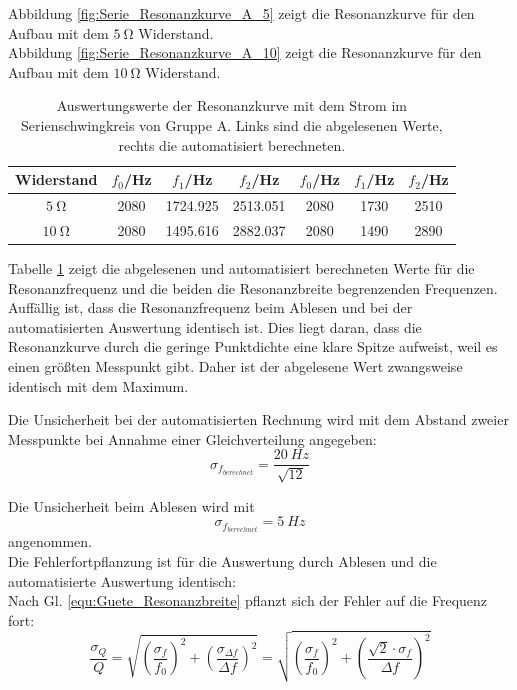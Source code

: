 \documentclass[12pt,a4paper]{article}
\begin{document}
Abbildung \ref{fig:Serie_Resonanzkurve_A_5} zeigt die Resonanzkurve für den Aufbau mit dem $\SI{5}{\ohm}$ Widerstand. \\
Abbildung \ref{fig:Serie_Resonanzkurve_A_10} zeigt die Resonanzkurve für den Aufbau mit dem $\SI{10}{\ohm}$ Widerstand.

\begin{table}
\centering
\begin{tabular}{|c|c|c|c||c|c|c|}
\hline
Widerstand & $f_0$/Hz & $f_1$/Hz & $f_2$/Hz & $f_0$/Hz & $f_1$/Hz & $f_2$/Hz \\
\hline
$\SI{5}{\ohm}$ & 2080 & 1724.925 & 2513.051 & 2080 & 1730 & 2510 \\
\hline
$\SI{10}{\ohm}$ & 2080 & 1495.616 & 2882.037 & 2080 & 1490 & 2890 \\
\hline
\end{tabular}
\caption{Auswertungswerte der Resonanzkurve mit dem Strom im Serienschwingkreis von Gruppe A. Links sind die abgelesenen Werte, rechts die automatisiert berechneten.}
\label{tab:StromResonanz_A}
\end{table}

Tabelle \ref{tab:StromResonanz_A} zeigt die abgelesenen und automatisiert berechneten Werte für die Resonanzfrequenz und die beiden die Resonanzbreite begrenzenden Frequenzen. Auffällig ist, dass die Resonanzfrequenz beim Ablesen und bei der automatisierten Auswertung identisch ist. Dies liegt daran, dass die Resonanzkurve durch die geringe Punktdichte eine klare Spitze aufweist, weil es einen größten Messpunkt gibt. Daher ist der abgelesene Wert zwangsweise identisch mit dem Maximum.

Die Unsicherheit bei der automatisierten Rechnung wird mit dem Abstand zweier Messpunkte bei Annahme einer Gleichverteilung angegeben:
\begin{equation*}
\sigma_{f_{berechnet}} = \dfrac{\SI{20}{Hz}}{\sqrt{12}}
\end{equation*}

Die Unsicherheit beim Ablesen wird mit 
\begin{equation*}
\sigma_{f_{berechnet}} = \SI{5}{Hz}
\end{equation*}
angenommen.\\
Die Fehlerfortpflanzung ist für die Auswertung durch Ablesen und die automatisierte Auswertung identisch:\\
Nach Gl. \ref{equ:Guete_Resonanzbreite} pflanzt sich der Fehler auf die Frequenz fort:
\begin{equation}
\dfrac{\sigma_Q}{Q} = \sqrt{\left( \dfrac{\sigma_f}{f_0} \right)^2 + \left( \dfrac{\sigma_{\Delta f}}{\Delta f} \right)^2} = \sqrt{\left( \dfrac{\sigma_f}{f_0} \right)^2 + \left( \dfrac{\sqrt{2} \cdot \sigma _f}{\Delta f} \right)^2}
\label{equ:FehlerGuete_FehlerFrequenz}
\end{equation}
\end{document}
